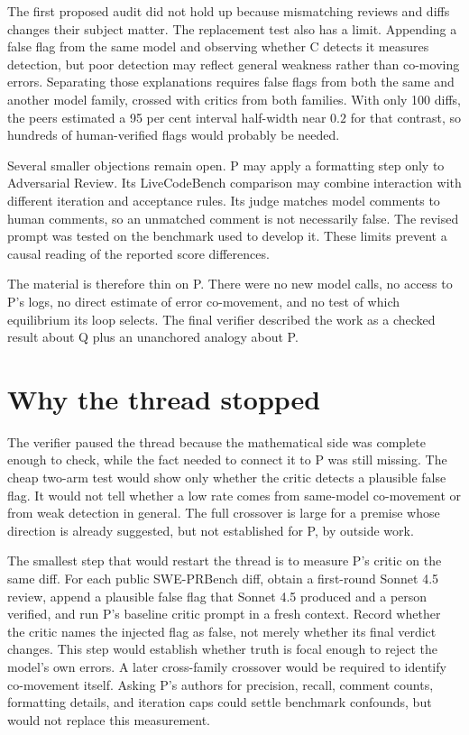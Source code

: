 \documentclass{article}
\begin{document}
The first proposed audit did not hold up because mismatching reviews and diffs changes their subject matter. The replacement test also has a limit. Appending a false flag from the same model and observing whether C detects it measures detection, but poor detection may reflect general weakness rather than co-moving errors. Separating those explanations requires false flags from both the same and another model family, crossed with critics from both families. With only 100 diffs, the peers estimated a 95 per cent interval half-width near $0.2$ for that contrast, so hundreds of human-verified flags would probably be needed.

Several smaller objections remain open. P may apply a formatting step only to Adversarial Review. Its LiveCodeBench comparison may combine interaction with different iteration and acceptance rules. Its judge matches model comments to human comments, so an unmatched comment is not necessarily false. The revised prompt was tested on the benchmark used to develop it. These limits prevent a causal reading of the reported score differences.

The material is therefore thin on P. There were no new model calls, no access to P's logs, no direct estimate of error co-movement, and no test of which equilibrium its loop selects. The final verifier described the work as a checked result about Q plus an unanchored analogy about P.

\section{Why the thread stopped}

The verifier paused the thread because the mathematical side was complete enough to check, while the fact needed to connect it to P was still missing. The cheap two-arm test would show only whether the critic detects a plausible false flag. It would not tell whether a low rate comes from same-model co-movement or from weak detection in general. The full crossover is large for a premise whose direction is already suggested, but not established for P, by outside work.

The smallest step that would restart the thread is to measure P's critic on the same diff. For each public SWE-PRBench diff, obtain a first-round Sonnet 4.5 review, append a plausible false flag that Sonnet 4.5 produced and a person verified, and run P's baseline critic prompt in a fresh context. Record whether the critic names the injected flag as false, not merely whether its final verdict changes. This step would establish whether truth is focal enough to reject the model's own errors. A later cross-family crossover would be required to identify co-movement itself. Asking P's authors for precision, recall, comment counts, formatting details, and iteration caps could settle benchmark confounds, but would not replace this measurement.



\end{document}
